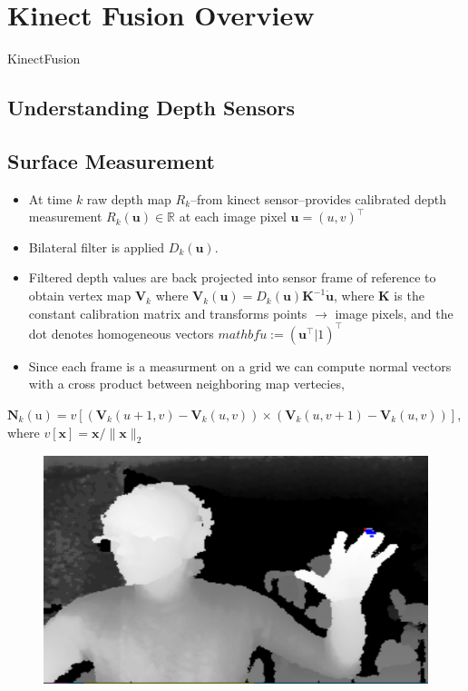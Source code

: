 \documentclass[10pt,twocolumn]{article}
\begin{document}


\section{Kinect Fusion Overview}
KinectFusion 

\subsection{Understanding Depth Sensors}

\subsection{Surface Measurement}

\begin{itemize}
\item At time $k$ raw depth map $R_k$--from kinect sensor--provides calibrated depth measurement $R_k(\mathbf{u}) \in \mathbb{R}$ at each image pixel $\mathbf{u} = (u,v)^{\top}$
\item Bilateral filter is applied $D_k(\mathbf{u})$. %
\item Filtered depth values are back projected into sensor frame of reference to obtain vertex map $\mathbf{V}_k$ where $\mathbf{V}_k(\mathbf{u}) = D_k(\mathbf{u})\mathbf{K}^{-1}\dot{\mathbf{u}}$, where $\mathbf{K}$ is the constant calibration matrix and transforms points $\rightarrow$ image pixels, and the dot denotes homogeneous vectors $mathbf{\dot{u}} := (\mathbf{u}^{\top}|1)^{\top}$
\item Since each frame is a measurment on a grid we can compute normal vectors with a cross product between neighboring map vertecies,\\ 
\end{itemize}
$\mathbf{N}_k(\mathrm{u}) = v[(\mathbf{V}_k(u+1,v) - \mathbf{V}_k(u, v)) \times (\mathbf{V}_k(u,v+1) - \mathbf{V}_k(u,v))]$, where $v[\mathbf{x}] = \mathbf{x} / \| \mathbf{x} \|_{2}$

\begin{figure}
\includegraphics[width=0.8\linewidth]{depthimage}
\end{figure}
\end{document}
